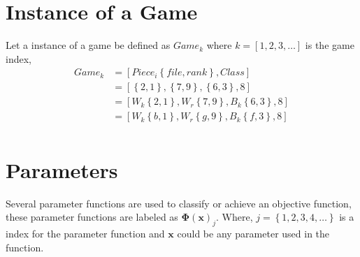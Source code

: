 \documentclass[10pt,fleqn]{article}%
\begin{document}
\section{Instance of a Game}
Let a instance of a game be defined as $Game_k$ where $k = \left[1,2,3,\dots\right]$ is the game index, 
%
\begin{equation*}
\begin{aligned}
	Game_k &= \left[Piece_i \left\{file, rank\right\}, Class\right]\\
	&= \left[\left\{2, 1\right\},\left\{7,9\right\},\left\{6,3\right\},8\right] \\
	&= \left[W_k \left\{2, 1\right\}, W_r \left\{7, 9\right\}, B_k \left\{6, 3\right\}, 8\right]\\
	&= \left[W_k \left\{b, 1\right\}, W_r \left\{g, 9\right\}, B_k \left\{f, 3\right\}, 8\right]\\
\end{aligned}
\end{equation*}

\section{Parameters}
Several parameter functions are used to classify or achieve an objective function, these parameter functions are labeled as $\mathbf{\Phi}\left(\mathbf{x}\right)_j$.  Where, $j = \left\{1,2,3,4,\dots\right\}$ is a index for the parameter function and $\mathbf{x}$ could be any parameter used in the function.
\end{document}
